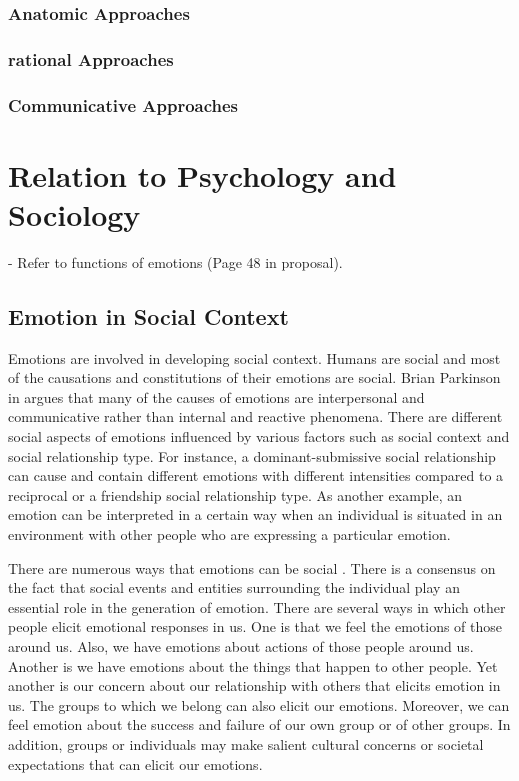 \documentclass[11pt]{article}
\begin{document}
\subsubsection{Anatomic Approaches}

\subsubsection{rational Approaches}

\subsubsection{Communicative Approaches}

\section{Relation to Psychology and Sociology}

- Refer to functions of emotions (Page 48 in proposal).

\subsection{Emotion in Social Context}

Emotions are involved in developing social context. Humans are social and most
of the causations and constitutions of their emotions are social. Brian
Parkinson in \cite{parkinson:emotions-social} argues that many of the causes of
emotions are interpersonal and communicative rather than internal and reactive
phenomena. There are different social aspects of emotions influenced by various
factors such as social context and social relationship type. For instance, a
dominant-submissive social relationship can cause and contain different emotions
with different intensities compared to a reciprocal or a friendship social
relationship type. As another example, an emotion can be interpreted in a
certain way when an individual is situated in an environment with other people
who are expressing a particular emotion.

There are numerous ways that emotions can be
social \cite{tiedens:social-life}. There is a consensus on the fact that social
events and entities surrounding the individual play an essential role in the
generation of emotion. There are several ways in which other people elicit
emotional responses in us. One is that we feel the emotions of those around us.
Also, we have emotions about actions of those people around us. Another is we
have emotions about the things that happen to other people. Yet another is our
concern about our relationship with others that elicits emotion in us. The
groups to which we belong can also elicit our emotions. Moreover, we can feel
emotion about the success and failure of our own group or of other groups. In
addition, groups or individuals may make salient cultural concerns or societal
expectations that can elicit our emotions.
\end{document}
